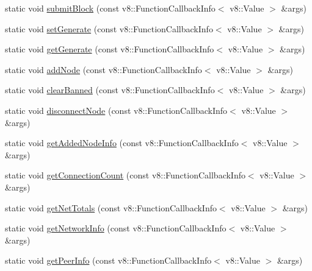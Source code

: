 \begin{DoxyCompactItemize}
\item 
static void \mbox{\hyperlink{class_rad_j_a_v_1_1_blockchain_v1_a3f7c1daa5de28377b414cc8497c113cc}{submit\+Block}} (const v8\+::\+Function\+Callback\+Info$<$ v8\+::\+Value $>$ \&args)
\item 
static void \mbox{\hyperlink{class_rad_j_a_v_1_1_blockchain_v1_a5bc8208f34c4cfa6bc58f2b193e4b140}{set\+Generate}} (const v8\+::\+Function\+Callback\+Info$<$ v8\+::\+Value $>$ \&args)
\item 
static void \mbox{\hyperlink{class_rad_j_a_v_1_1_blockchain_v1_aef7f4f1d0ccbe765405124c5debfdd3e}{get\+Generate}} (const v8\+::\+Function\+Callback\+Info$<$ v8\+::\+Value $>$ \&args)
\item 
static void \mbox{\hyperlink{class_rad_j_a_v_1_1_blockchain_v1_afa22f76c157e89816d6d13fb7379a704}{add\+Node}} (const v8\+::\+Function\+Callback\+Info$<$ v8\+::\+Value $>$ \&args)
\item 
static void \mbox{\hyperlink{class_rad_j_a_v_1_1_blockchain_v1_a3bafc42e7917b55f5f09d52aeee3156c}{clear\+Banned}} (const v8\+::\+Function\+Callback\+Info$<$ v8\+::\+Value $>$ \&args)
\item 
static void \mbox{\hyperlink{class_rad_j_a_v_1_1_blockchain_v1_a5651bc12976f1f6d941a2ef255529f98}{disconnect\+Node}} (const v8\+::\+Function\+Callback\+Info$<$ v8\+::\+Value $>$ \&args)
\item 
static void \mbox{\hyperlink{class_rad_j_a_v_1_1_blockchain_v1_a8258066a48741015de7b3ac6c48db524}{get\+Added\+Node\+Info}} (const v8\+::\+Function\+Callback\+Info$<$ v8\+::\+Value $>$ \&args)
\item 
static void \mbox{\hyperlink{class_rad_j_a_v_1_1_blockchain_v1_ac8a10b56cda7f24a565c1d8a1467b721}{get\+Connection\+Count}} (const v8\+::\+Function\+Callback\+Info$<$ v8\+::\+Value $>$ \&args)
\item 
static void \mbox{\hyperlink{class_rad_j_a_v_1_1_blockchain_v1_aaf0581c345d62724b847ea02323308ab}{get\+Net\+Totals}} (const v8\+::\+Function\+Callback\+Info$<$ v8\+::\+Value $>$ \&args)
\item 
static void \mbox{\hyperlink{class_rad_j_a_v_1_1_blockchain_v1_a77b5d33f281f171bdccc05dc9a83b276}{get\+Network\+Info}} (const v8\+::\+Function\+Callback\+Info$<$ v8\+::\+Value $>$ \&args)
\item 
static void \mbox{\hyperlink{class_rad_j_a_v_1_1_blockchain_v1_af72aed33c405b789dc5cc916e6f5a773}{get\+Peer\+Info}} (const v8\+::\+Function\+Callback\+Info$<$ v8\+::\+Value $>$ \&args)
\item 

\end{DoxyCompactItemize}
